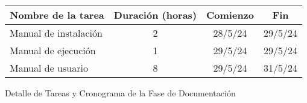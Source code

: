 \begin{planificacion}
	\centering
	\begin{tabular}{ | m{9cm} | c | c | c | }
		\hline
		\textbf{Nombre de la tarea} & \textbf{Duración (horas)} & \textbf{Comienzo} & \textbf{Fin} \\\hline
		Manual de instalación       & 2                         & 28/5/24           & 29/5/24      \\\hline
		Manual de ejecución         & 1                         & 29/5/24           & 29/5/24      \\\hline
		Manual de usuario           & 8                         & 29/5/24           & 31/5/24      \\\hline
	\end{tabular}
	\caption{Detalle de Tareas y Cronograma de la Fase de Documentación}
\end{planificacion}

